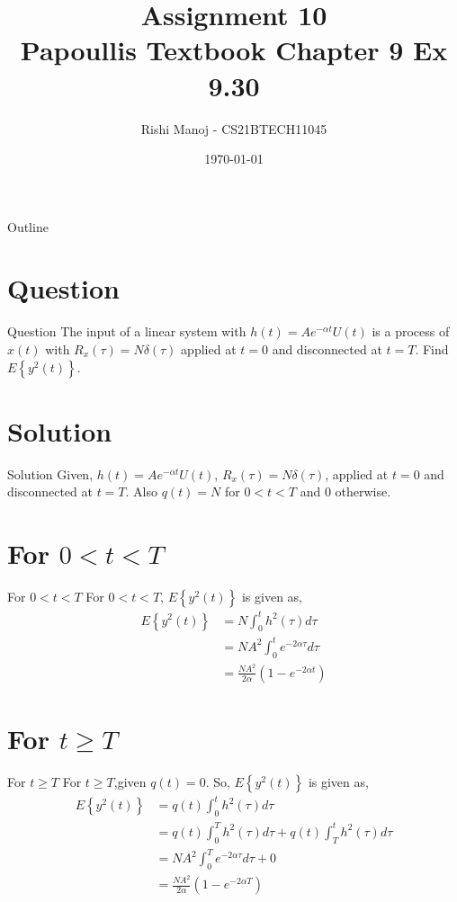 \documentclass{beamer}
\title{Assignment 10 \\ Papoullis Textbook Chapter 9 Ex 9.30}
\author{Rishi Manoj - CS21BTECH11045}
\date{\today}
\providecommand{\cbrak}[1]{\ensuremath{\left\{#1\right\}}}
\begin{document}
\begin{frame}
    \titlepage 
\end{frame}

\logo{}


\begin{frame}{Outline}
    \tableofcontents
\end{frame}


\section{Question}
\begin{frame}{Question}
The input of a linear system with $h(t) = Ae^{-\alpha t}U(t)$ is a process of $x(t)$ with $R_x(\tau)=N\delta(\tau)$ applied at $t=0$ and disconnected at $t=T$. Find $E\cbrak{y^2(t)}$.
\end{frame}


\section{Solution}
\begin{frame}{Solution}
Given, $h(t) = Ae^{-\alpha t}U(t)$, $R_x(\tau)=N\delta(\tau)$, applied at $t=0$ and disconnected at $t=T$. Also $q(t)=N$ for $0<t<T$ and 0 otherwise.
\end{frame}


\section{For $0<t<T$}
\begin{frame}{For $0<t<T$}
For $0<t<T$, $E\cbrak{y^2(t)}$ is given as,
	\begin{align}
	       E\cbrak{y^2(t)} &= N\int_{0}^{t}h^2(\tau)d\tau \\
	                       &= NA^2\int_{0}^{t}e^{-2\alpha\tau}d\tau \\
	                       &= \frac{NA^2}{2\alpha}(1-e^{-2\alpha t})
    \end{align}
\end{frame}


\section{For $t\ge T$}
\begin{frame}{For $t\ge T$}
For $t\ge T$,given $q(t)=0$. So, $E\cbrak{y^2(t)}$ is given as,
    \begin{align}
           E\cbrak{y^2(t)} &= q(t)\int_{0}^{t}h^2(\tau)d\tau \\
	                       &= q(t)\int_{0}^{T}h^2(\tau)d\tau + q(t)\int_{T}^{t}h^2(\tau)d\tau \\
	                       &= NA^2\int_{0}^{T}e^{-2\alpha\tau}d\tau + 0 \\ 
	                       &= \frac{NA^2}{2\alpha}(1-e^{-2\alpha T})
    \end{align}
\end{frame}
\end{document}
